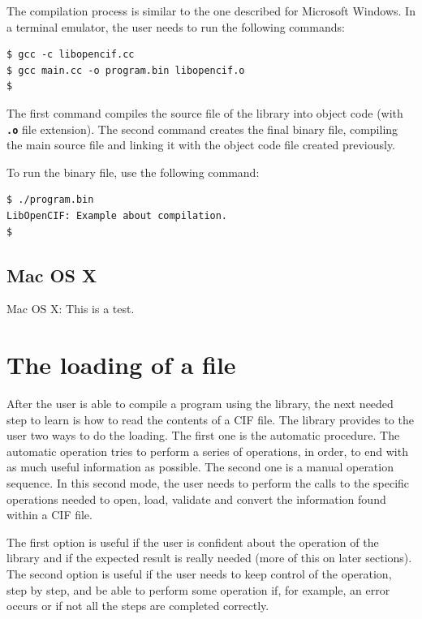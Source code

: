 \documentclass[11pt,twoside,openany,x11names,svgnames]{memoir}
\begin{document}
The compilation process is similar to the one described for Microsoft Windows. In a terminal emulator, the user needs to run the following commands:

\begin{lstlisting}[frame=single,style=SystemCommandStyle]
$ gcc -c libopencif.cc
$ gcc main.cc -o program.bin libopencif.o
$
\end{lstlisting}

The first command compiles the source file of the library into object code (with \textbf{\texttt{.o}} file extension). The second command creates the final binary file, compiling the main source file and linking it with the object code file created previously.

To run the binary file, use the following command:

\begin{lstlisting}[frame=single,style=SystemCommandStyle]
$ ./program.bin
LibOpenCIF: Example about compilation.
$
\end{lstlisting}

\subsection{Mac OS X}\label{Mac-OS-X}

Mac OS X: This is a test.

\section{The loading of a file}\label{The-loading-of-a-file}

After the user is able to compile a program using the library, the next needed step to learn is how to read the contents of a CIF file. The library provides to the user two ways to do the loading. The first one is the automatic procedure. The automatic operation tries to perform a series of operations, in order, to end with as much useful information as possible. The second one is a manual operation sequence. In this second mode, the user needs to perform the calls to the specific operations needed to open, load, validate and convert the information found within a CIF file.

The first option is useful if the user is confident about the operation of the library and if the expected result is really needed (more of this on later sections). The second option is useful if the user needs to keep control of the operation, step by step, and be able to perform some operation if, for example, an error occurs or if not all the steps are completed correctly.
\end{document}
